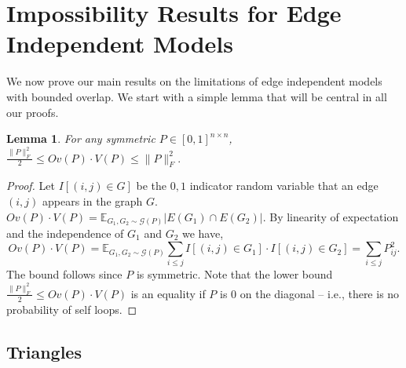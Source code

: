 \documentclass{article}
\newtheorem{lemma}[theorem]{Lemma}
\newtheorem{definition}{Definition}
\newcommand{\norm}[1]{\|#1\|}
\newcommand{\E}{\mathbb{E}}
\begin{document}
\section{Impossibility Results for Edge Independent Models}
\label{sec:impossibility}

We now prove our main results on the limitations of edge independent models with bounded overlap. %
We start with a simple lemma that will be central in all our proofs.


\begin{lemma}\label{lem:mainSimple} For any symmetric $P \in [0,1]^{n \times n}$, $\frac{\norm{P}_F^2}{2} \le Ov(P) \cdot V(P) \le \norm{P}_F^2.$
\end{lemma}
\begin{proof}
Let $I[(i,j) \in G]$ be the $0,1$ indicator random variable that an edge $(i,j)$ appears in the graph $G$.  $Ov(P) \cdot V(P) = \E_{G_1,G_2 \sim \mathcal{G}(P)} |E(G_1) \cap E(G_2)|$. 
By linearity of expectation and the independence of $G_1$ and $G_2$ we have,
$$Ov(P) \cdot V(P) = \E_{G_1,G_2 \sim \mathcal{G}(P)} \sum_{i \le j} I[(i,j) \in G_1] \cdot I[(i,j) \in G_2] = \sum_{i \le j} P_{ij}^2.$$
The bound follows since $P$ is symmetric. Note that the lower bound $\frac{\norm{P}_F^2}{2} \le Ov(P) \cdot V(P)$ is an equality if $P$ is $0$ on the diagonal -- i.e., there is no probability of self loops.
\end{proof}


\subsection{Triangles}
\end{document}

